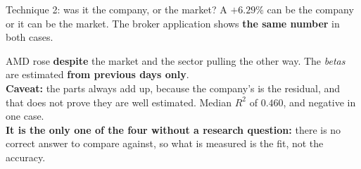 \documentclass[aspectratio=169]{beamer}
\begin{document}
\begin{frame}{Technique 2: was it the company, or the market?}
A $+6.29\%$ can be the company or it can be the market. The broker application
shows \textbf{the same number} in both cases.
\vspace{2mm}
\begin{center}
\end{center}
\vspace{1mm}
\footnotesize
AMD rose \textbf{despite} the market and the sector pulling the other way.
The \emph{betas} are estimated \textbf{from previous days only}.\\
\textbf{Caveat:} the parts always add up, because the company's is the residual, and that does
not prove they are well estimated. Median $R^2$ of $0.460$, and negative in one case.\\
\textbf{It is the only one of the four without a research question:} there is no correct answer
to compare against, so what is measured is the fit, not the accuracy.
\end{frame}
\end{document}
